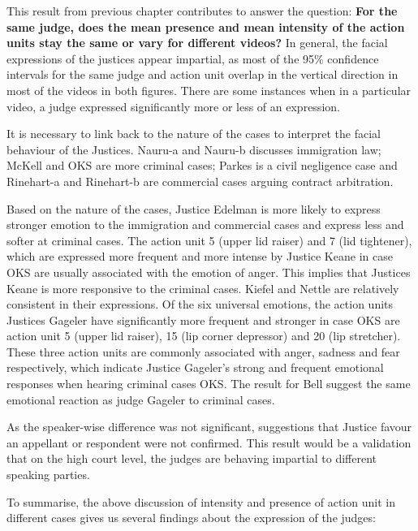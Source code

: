 \documentclass{monashthesis}
\begin{document}
This result from previous chapter contributes to answer the question: \textbf{For the same judge, does the mean presence and mean intensity of the action units stay the same or vary for different videos?} In general, the facial expressions of the justices appear impartial, as most of the 95\% confidence intervals for the same judge and action unit overlap in the vertical direction in most of the videos in both figures. There are some instances when in a particular video, a judge expressed significantly more or less of an expression.

It is necessary to link back to the nature of the cases to interpret the facial behaviour of the Justices. Nauru-a and Nauru-b discusses immigration law; McKell and OKS are more criminal cases; Parkes is a civil negligence case and Rinehart-a and Rinehart-b are commercial cases arguing contract arbitration.

Based on the nature of the cases, Justice Edelman is more likely to express stronger emotion to the immigration and commercial cases and express less and softer at criminal cases. The action unit 5 (upper lid raiser) and 7 (lid tightener), which are expressed more frequent and more intense by Justice Keane in case OKS are usually associated with the emotion of anger. This implies that Justices Keane is more responsive to the criminal cases. Kiefel and Nettle are relatively consistent in their expressions. Of the six universal emotions, the action units Justices Gageler have significantly more frequent and stronger in case OKS are action unit 5 (upper lid raiser), 15 (lip corner depressor) and 20 (lip stretcher). These three action units are commonly associated with anger, sadness and fear respectively, which indicate Justice Gageler's strong and frequent emotional responses when hearing criminal cases OKS. The result for Bell suggest the same emotional reaction as judge Gageler to criminal cases.

As the speaker-wise difference was not significant, suggestions that Justice favour an appellant or respondent were not confirmed. This result would be a validation that on the high court level, the judges are behaving impartial to different speaking parties.

To summarise, the above discussion of intensity and presence of action unit in different cases gives us several findings about the expression of the judges:
\end{document}
